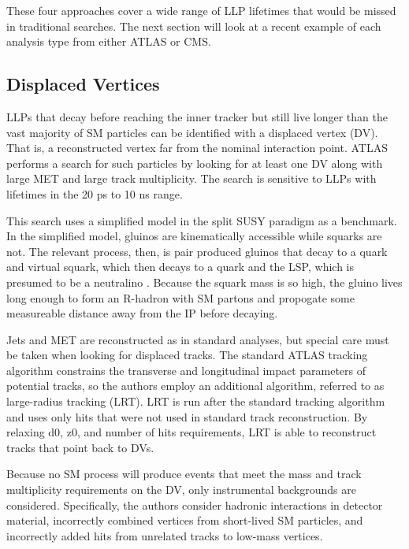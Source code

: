 \documentclass[12pt]{article}
\begin{document}
    These four approaches cover a wide range of LLP lifetimes that would be missed in traditional searches. The next section will look  at a recent example of each analysis type from either ATLAS or CMS.

\subsection{Displaced Vertices}
    LLPs that decay before reaching the inner tracker but still live longer than the vast majority of SM particles can be identified with a displaced vertex (DV). That is, a reconstructed vertex far from the nominal interaction point. ATLAS performs a search for such particles by looking for at least one DV along with large MET and large track multiplicity. The search is sensitive to LLPs with lifetimes in the 20 ps to 10 ns range.

    This search uses a simplified model in the split SUSY paradigm as a benchmark. In the simplified model, gluinos are kinematically accessible while squarks are not. The relevant process, then, is pair produced gluinos that decay to a quark and virtual squark, which then decays to a quark and the LSP, which is presumed to be a neutralino . Because the squark mass is so high, the gluino lives long enough to form an R-hadron  with SM partons and propogate some measureable distance away from the IP before decaying. 

    Jets and MET are reconstructed as in standard analyses, but special care must be taken when looking for displaced tracks. The standard ATLAS tracking algorithm constrains the transverse and longitudinal impact parameters of potential tracks, so the authors employ an additional algorithm, referred to as large-radius tracking (LRT). LRT is run after the standard tracking algorithm and uses only hits that were not used in standard track reconstruction. By relaxing d0, z0, and number of hits requirements, LRT is able to reconstruct tracks that point back to DVs.
    
    Because no SM process will produce events that meet the mass and track multiplicity requirements on the DV, only instrumental backgrounds are considered. Specifically, the authors consider hadronic interactions in detector material, incorrectly combined vertices from short-lived SM particles, and incorrectly added hits from unrelated tracks to low-mass vertices.
\end{document}
